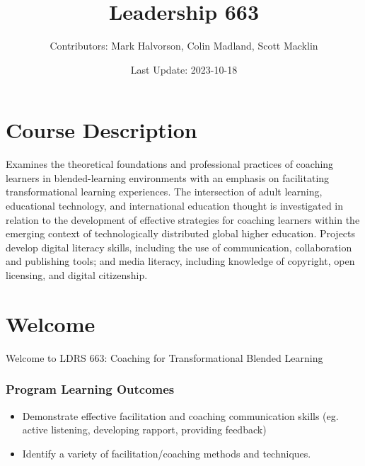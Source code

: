 \documentclass[
]{book}
\title{Leadership 663}
\author{Contributors: Mark Halvorson, Colin Madland, Scott Macklin}
\date{Last Update: 2023-10-18}
\providecommand{\tightlist}{%
  \setlength{\itemsep}{0pt}\setlength{\parskip}{0pt}}
\begin{document}
\maketitle

{
\setcounter{tocdepth}{1}
\tableofcontents
}
\hypertarget{course-description}{%
\chapter*{Course Description}\label{course-description}}

Examines the theoretical foundations and professional practices of coaching learners in blended-learning environments with an emphasis on facilitating transformational learning experiences. The intersection of adult learning, educational technology, and international education thought is investigated in relation to the development of effective strategies for coaching learners within the emerging context of technologically distributed global higher education. Projects develop digital literacy skills, including the use of communication, collaboration and publishing tools; and media literacy, including knowledge of copyright, open licensing, and digital citizenship.

\hypertarget{welcome}{%
\chapter*{Welcome}\label{welcome}}

Welcome to LDRS 663: Coaching for Transformational Blended Learning

\hypertarget{program-learning-outcomes}{%
\subsection*{Program Learning Outcomes}\label{program-learning-outcomes}}

\begin{itemize}
\tightlist
\item
  Demonstrate effective facilitation and coaching communication skills (eg. active listening, developing rapport, providing feedback)\\
\item
  Identify a variety of facilitation/coaching methods and techniques.
\end{itemize}
\end{document}
